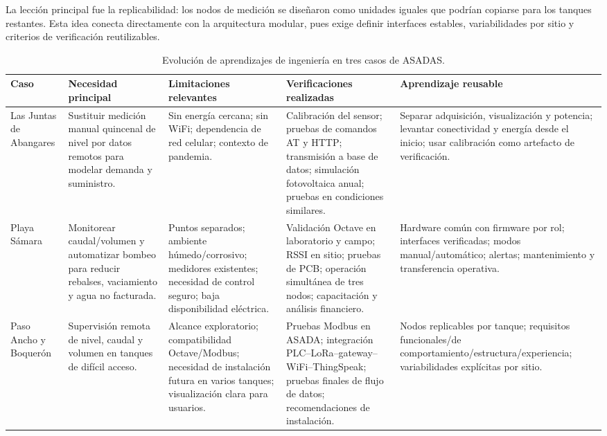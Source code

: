\documentclass[conference]{IEEEtran}
\begin{document}
La lección principal fue la replicabilidad: los nodos de medición se diseñaron como unidades iguales que podrían copiarse para los tanques restantes. Esta idea conecta directamente con la arquitectura modular, pues exige definir interfaces estables, variabilidades por sitio y criterios de verificación reutilizables.

\begin{table}[t]
\caption{Evolución de aprendizajes de ingeniería en tres casos de ASADAS.}
\label{tab:casos}
\centering
\scriptsize
\begin{tabular}{L{2.6cm} L{3.0cm} L{3.2cm} L{3.5cm} L{3.5cm}}
\hline
Caso & Necesidad principal & Limitaciones relevantes & Verificaciones realizadas & Aprendizaje reusable \\
\hline
Las Juntas de Abangares \cite{Chavarria2021} & Sustituir medición manual quincenal de nivel por datos remotos para modelar demanda y suministro. & Sin energía cercana; sin WiFi; dependencia de red celular; contexto de pandemia. & Calibración del sensor; pruebas de comandos AT y HTTP; transmisión a base de datos; simulación fotovoltaica anual; pruebas en condiciones similares. & Separar adquisición, visualización y potencia; levantar conectividad y energía desde el inicio; usar calibración como artefacto de verificación. \\
Playa Sámara \cite{Solorzano2021} & Monitorear caudal/volumen y automatizar bombeo para reducir rebalses, vaciamiento y agua no facturada. & Puntos separados; ambiente húmedo/corrosivo; medidores existentes; necesidad de control seguro; baja disponibilidad eléctrica. & Validación Octave en laboratorio y campo; RSSI en sitio; pruebas de PCB; operación simultánea de tres nodos; capacitación y análisis financiero. & Hardware común con firmware por rol; interfaces verificadas; modos manual/automático; alertas; mantenimiento y transferencia operativa. \\
Paso Ancho y Boquerón \cite{Oviedo2024} & Supervisión remota de nivel, caudal y volumen en tanques de difícil acceso. & Alcance exploratorio; compatibilidad Octave/Modbus; necesidad de instalación futura en varios tanques; visualización clara para usuarios. & Pruebas Modbus en ASADA; integración PLC--LoRa--gateway--WiFi--ThingSpeak; pruebas finales de flujo de datos; recomendaciones de instalación. & Nodos replicables por tanque; requisitos funcionales/de comportamiento/estructura/experiencia; variabilidades explícitas por sitio. \\
\hline
\end{tabular}
\end{table}
\end{document}
